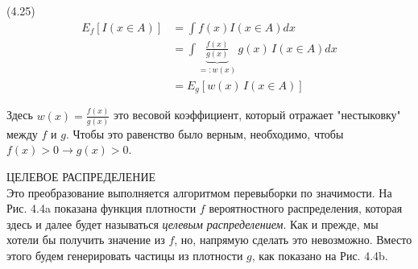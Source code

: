 \documentclass[10pt,a4paper]{article}
\begin{document}
(4.25)
\begin{equation*}
\begin{split}
E_f[I(x\in A)]&=\int f(x) I(x\in A)dx\\
&=\int\underbrace{\frac{f(x)}{g(x)}}_{=:w(x)}\,g(x)\,I(x\in A)dx\\
&=E_g[w(x)\,I(x\in A)]
\end{split}
\end{equation*}

Здесь $w(x)=\frac{f(x)}{g(x)}$ это весовой коэффициент, который отражает "нестыковку" между $f$ и $g$. Чтобы это равенство было верным, необходимо, чтобы $f(x)>0\longrightarrow
g(x)>0$.

ЦЕЛЕВОЕ РАСПРЕДЕЛЕНИЕ\\
Это преобразование выполняется алгоритмом перевыборки по значимости. На Рис. 4.4a показана функция плотности $f$ вероятностного распределения, которая
здесь и далее будет называться \textit{целевым распределением}. Как и прежде, мы хотели бы получить значение из $f$, но, напрямую сделать это невозможно. Вместо этого будем генерировать частицы из плотности $g$, как показано на
Рис. 4.4b.\\
\end{document}
